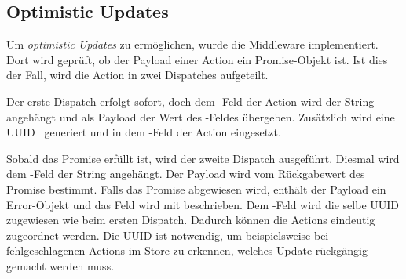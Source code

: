 \subsection{Optimistic Updates}
\label{ssec:fm_optimistic_updates}

Um \emph{optimistic Updates} zu ermöglichen, wurde die Middleware
 implementiert.  Dort wird geprüft, ob der Payload einer Action
ein Promise-Objekt ist.  Ist dies der Fall, wird die Action in zwei Dispatches
aufgeteilt.

Der erste Dispatch erfolgt sofort, doch dem -Feld der
Action wird der String  angehängt und als Payload der
Wert des -Feldes übergeben.  Zusätzlich wird eine UUID~\cite{RFC4122}
generiert und in dem -Feld der Action eingesetzt.

Sobald das Promise erfüllt ist, wird der zweite Dispatch ausgeführt.  Diesmal
wird dem -Feld der String  angehängt.  Der
Payload wird vom Rückgabewert des Promise bestimmt.  Falls das Promise
abgewiesen wird, enthält der Payload ein Error-Objekt und das Feld 
wird mit  beschrieben.  Dem -Feld wird die selbe UUID
zugewiesen wie beim ersten Dispatch.  Dadurch können die Actions eindeutig
zugeordnet werden.  Die UUID ist notwendig, um beispielsweise bei
fehlgeschlagenen Actions im Store zu erkennen, welches Update rückgängig
gemacht werden muss.
